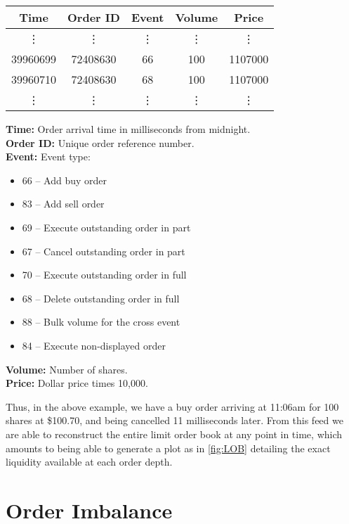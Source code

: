 \begin{table}[H]
\centering
{}
\begin{tabular}{@{} *{5}{c} @{}}
\toprule
Time & Order ID & Event & Volume & Price \\
\midrule
\vdots & \vdots & \vdots & \vdots & \vdots \\
39960699 &72408630 & 66 & 100 & 1107000 \\
39960710 & 72408630 & 68 & 100 & 1107000 \\
\vdots & \vdots & \vdots & \vdots & \vdots \\
\bottomrule
\end{tabular}
\label{tbl:ITCHevents}
\end{table}
{\bf Time:} Order arrival time in milliseconds from midnight. \\
{\bf Order ID:} Unique order reference number. \\
{\bf Event:} Event type:
\vspace{-\topsep}
\begin{itemize}[label={},nolistsep]
\item 66 -- Add buy order
\item 83 -- Add sell order
\item 69 -- Execute outstanding order in part
\item 67 -- Cancel outstanding order in part
\item 70 -- Execute outstanding order in full
\item 68 -- Delete outstanding order in full
\item 88 -- Bulk volume for the cross event
\item 84 -- Execute non-displayed order
\end{itemize}
\vspace{-\topsep}
{\bf Volume:} Number of shares. \\
{\bf Price:} Dollar price times 10,000. \par  
Thus, in the above example, we have a buy order arriving at 11:06am for 100 shares at \$100.70, and being cancelled 11 milliseconds later. From this feed we are able to reconstruct the entire limit order book at any point in time, which amounts to being able to generate a plot as in \autoref{fig:LOB} detailing the exact liquidity available at each order depth.

\section{Order Imbalance}

